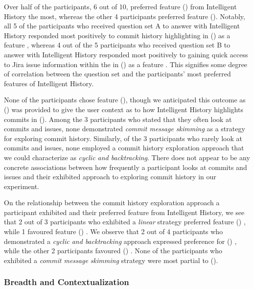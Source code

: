 Over half of the participants, 6 out of 10, preferred feature () from Intelligent History the most,
whereas the other 4 participants preferred feature ().
Notably, all 5 of the participants who received question set A to answer with Intelligent History 
responded most positively to commit history highlighting in () as a feature , 
whereas 4 out of the 5 participants who received question set B to answer with Intelligent History 
responded most positively to gaining quick access to Jira issue information within the  in () as a feature .
This signifies some degree of correlation between the question set and the participants' most preferred features of Intelligent History.

None of the participants chose feature (), though we anticipated this outcome as () 
was provided to give the user context as to how Intelligent History highlights commits in ().
Among the 3 participants who stated that they often look at commits and issues, none demonstrated \textit{commit message skimming} 
as a strategy for exploring commit history.
Similarly, of the 3 participants who rarely look at commits and issues, none employed a commit history exploration approach 
that we could characterize as \textit{cyclic and backtracking}.
There does not appear to be any concrete associations between how frequently a participant looks at commits and issues
and their exhibited approach to exploring commit history in our experiment.

On the relationship between the commit history exploration approach 
a participant exhibited and their preferred feature from Intelligent History,
we see that 2 out of 3 participants who exhibited a \textit{linear} strategy preferred feature () ,
while 1 favoured feature () .
We observe that 2 out of 4 participants who demonstrated a \textit{cyclic and backtracking} 
approach expressed preference for () ,
while the other 2 participants favoured () .
None of the participants who exhibited a \textit{commit message skimming} strategy 
were most partial to ().

\subsubsection{Breadth and Contextualization}

